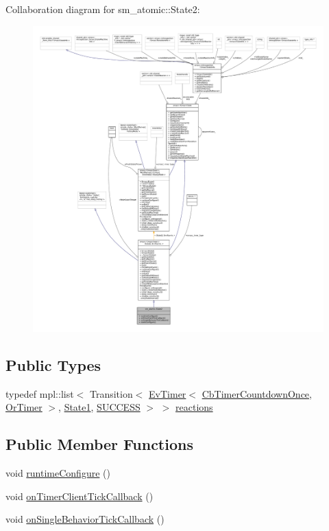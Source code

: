 Collaboration diagram for sm\+\_\+atomic\+:\+:State2\+:
\nopagebreak
\begin{figure}[H]
\begin{center}
\leavevmode
\includegraphics[width=350pt]{structsm__atomic_1_1State2__coll__graph}
\end{center}
\end{figure}
\subsection*{Public Types}
\begin{DoxyCompactItemize}
\item 
typedef mpl\+::list$<$ Transition$<$ \hyperlink{structcl__ros__timer__client_1_1EvTimer}{Ev\+Timer}$<$ \hyperlink{classcl__ros__timer__client_1_1CbTimerCountdownOnce}{Cb\+Timer\+Countdown\+Once}, \hyperlink{classsm__atomic_1_1OrTimer}{Or\+Timer} $>$, \hyperlink{structsm__atomic_1_1State1}{State1}, \hyperlink{structsmacc_1_1default__transition__tags_1_1SUCCESS}{S\+U\+C\+C\+E\+SS} $>$ $>$ \hyperlink{structsm__atomic_1_1State2_a9436556de6be8ea64fd35707aa4bfec8}{reactions}
\end{DoxyCompactItemize}
\subsection*{Public Member Functions}
\begin{DoxyCompactItemize}
\item 
void \hyperlink{structsm__atomic_1_1State2_afd749890e13d8aa36f1ac6645a5f7f9a}{runtime\+Configure} ()
\item 
void \hyperlink{structsm__atomic_1_1State2_ab265295bfddde63b2dcf5f97bfc44e48}{on\+Timer\+Client\+Tick\+Callback} ()
\item 
void \hyperlink{structsm__atomic_1_1State2_a871fb6c688a61bb4902ea6d44f51025c}{on\+Single\+Behavior\+Tick\+Callback} ()
\end{DoxyCompactItemize}
